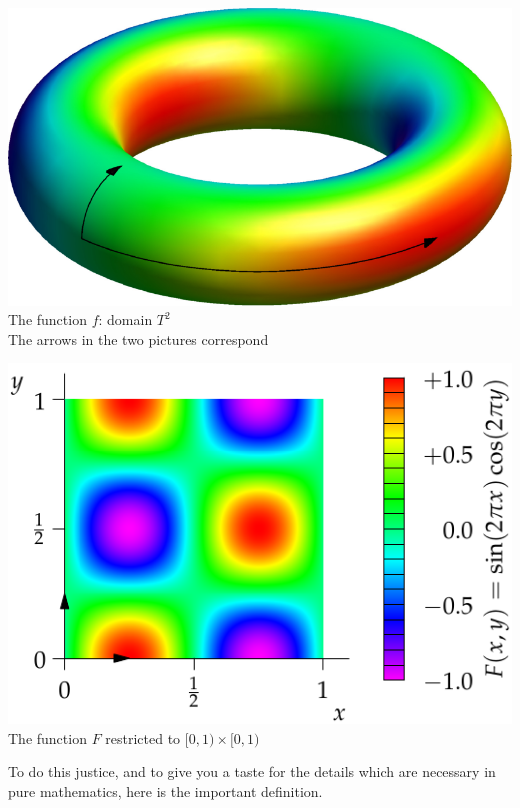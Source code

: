 \begin{center}
	\begin{minipage}{0.45\textwidth}\centering
		\includegraphics[width=\textwidth]{relations-14-torus}\\[14pt]
		The function $f$: domain $T^2$\\
		The arrows in the two pictures correspond
	\end{minipage}\qquad
	\begin{minipage}{0.45\textwidth}\centering
		\includegraphics[width=\textwidth]{relations-14-torus2}\\
		The function $F$ restricted to $[0,1)\times [0,1)$
	\end{minipage}
\end{center}


To do this justice, and to give you a taste for the details which are necessary in pure mathematics, here is the important definition.

